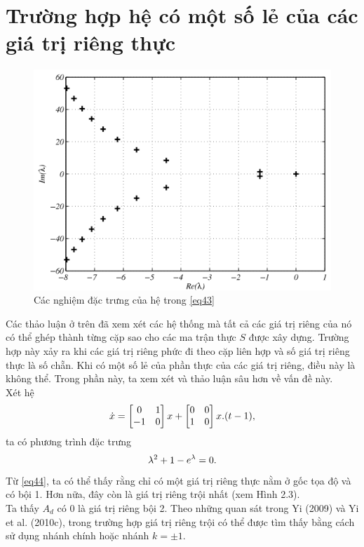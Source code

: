 \section{Trường hợp hệ có một số lẻ của các giá trị riêng thực}
\begin{figure}[h!]
	\centering
	\includegraphics[scale= 0.7]{"./Hinh/Hinh 3"}
	\caption[Các nghiệm đặc trưng của hệ trong  \eqref{43} ] {Các nghiệm đặc trưng của hệ trong  \eqref{eq43}}
	\label{fig:hinh-2}
\end{figure}
\noindent Các thảo luận ở trên đã xem xét các hệ thống mà tất cả các giá trị riêng của nó có thể ghép thành từng cặp sao cho các ma trận thực $S$ được xây dựng. 
Trường hợp này xảy ra khi các giá trị riêng phức đi theo cặp liên hợp và số giá trị riêng thực là số chẵn. Khi có một số lẻ của phần thực của các giá trị riêng, điều này là không thể. Trong phần này, ta xem xét và thảo luận sâu hơn về vấn đề này.\\
Xét hệ
\begin{equation}\label{eq43}
\dot{x} = \begin{bmatrix} 0 & 1\\ - 1 & 0 \end{bmatrix}x + \begin{bmatrix} 0 & 0 \\ 1 & 0 \end{bmatrix}x.(t - 1),
\end{equation}
ta có phương trình đặc trưng
\begin{equation}\label{eq44}
	\lambda^2 + 1 - e^{\lambda} = 0.
\end{equation}
Từ \eqref{eq44}, ta có thể thấy rằng chỉ có một giá trị riêng thực nằm ở gốc tọa độ và có bội 1. Hơn nữa, đây còn là giá trị riêng trội nhất (xem Hình 2.3).\\
Ta thấy $A_d$ có $0$ là giá trị riêng bội 2. Theo những quan sát trong Yi (2009) và Yi et al. (2010c), trong trường hợp giá trị riêng trội có thể được tìm thấy bằng cách sử dụng nhánh chính hoặc nhánh $k = \pm1$.\\
